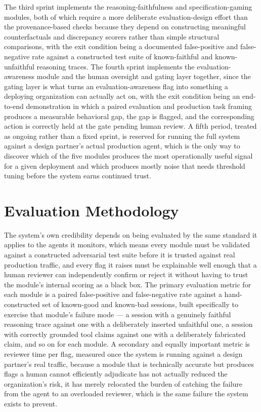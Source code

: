 \documentclass[11pt,a4paper]{article}
\begin{document}
The third sprint implements the reasoning-faithfulness and specification-gaming modules, both of which require a more deliberate evaluation-design effort than the provenance-based checks because they depend on constructing meaningful counterfactuals and discrepancy scorers rather than simple structural comparisons, with the exit condition being a documented false-positive and false-negative rate against a constructed test suite of known-faithful and known-unfaithful reasoning traces. The fourth sprint implements the evaluation-awareness module and the human oversight and gating layer together, since the gating layer is what turns an evaluation-awareness flag into something a deploying organization can actually act on, with the exit condition being an end-to-end demonstration in which a paired evaluation and production task framing produces a measurable behavioral gap, the gap is flagged, and the corresponding action is correctly held at the gate pending human review. A fifth period, treated as ongoing rather than a fixed sprint, is reserved for running the full system against a design partner's actual production agent, which is the only way to discover which of the five modules produces the most operationally useful signal for a given deployment and which produces mostly noise that needs threshold tuning before the system earns continued trust.

\section{Evaluation Methodology}

The system's own credibility depends on being evaluated by the same standard it applies to the agents it monitors, which means every module must be validated against a constructed adversarial test suite before it is trusted against real production traffic, and every flag it raises must be explainable well enough that a human reviewer can independently confirm or reject it without having to trust the module's internal scoring as a black box. The primary evaluation metric for each module is a paired false-positive and false-negative rate against a hand-constructed set of known-good and known-bad sessions, built specifically to exercise that module's failure mode --- a session with a genuinely faithful reasoning trace against one with a deliberately inserted unfaithful one, a session with correctly grounded tool claims against one with a deliberately fabricated claim, and so on for each module. A secondary and equally important metric is reviewer time per flag, measured once the system is running against a design partner's real traffic, because a module that is technically accurate but produces flags a human cannot efficiently adjudicate has not actually reduced the organization's risk, it has merely relocated the burden of catching the failure from the agent to an overloaded reviewer, which is the same failure the system exists to prevent.
\end{document}
